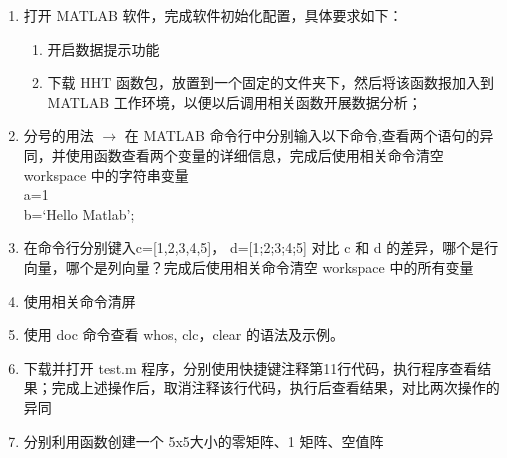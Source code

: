 \documentclass{rsreport}
\begin{document}
    \maketitle
    \begin{enumerate}
        \item 打开 MATLAB 软件，完成软件初始化配置，具体要求如下：
        \begin{enumerate}
            \item 开启数据提示功能
            \item 下载 HHT 函数包，放置到一个固定的文件夹下，然后将该函数报加入到MATLAB 工作环境，以便以后调用相关函数开展数据分析；
        \end{enumerate}
        \item 分号的用法 $ \to $ 在 MATLAB 命令行中分别输入以下命令,查看两个语句的异同，并使用函数查看两个变量的详细信息，完成后使用相关命令清空 workspace 中的字符串变量\\
        a=1 \\
        b=‘Hello Matlab’;
        \item 在命令行分别键入c=[1,2,3,4,5]， d=[1;2;3;4;5]
        对比 c 和 d 的差异，哪个是行向量，哪个是列向量？完成后使用相关命令清空 workspace 中的所有变量
        \item 使用相关命令清屏 
        \item 使用 doc 命令查看 whos, clc，clear 的语法及示例。
        \item 下载并打开 test.m 程序，分别使用快捷键注释第11行代码，执行程序查看结果；完成上述操作后，取消注释该行代码，执行后查看结果，对比两次操作的异同
        \item 分别利用函数创建一个 5x5大小的零矩阵、1 矩阵、空值阵
    \end{enumerate}
\end{document}
